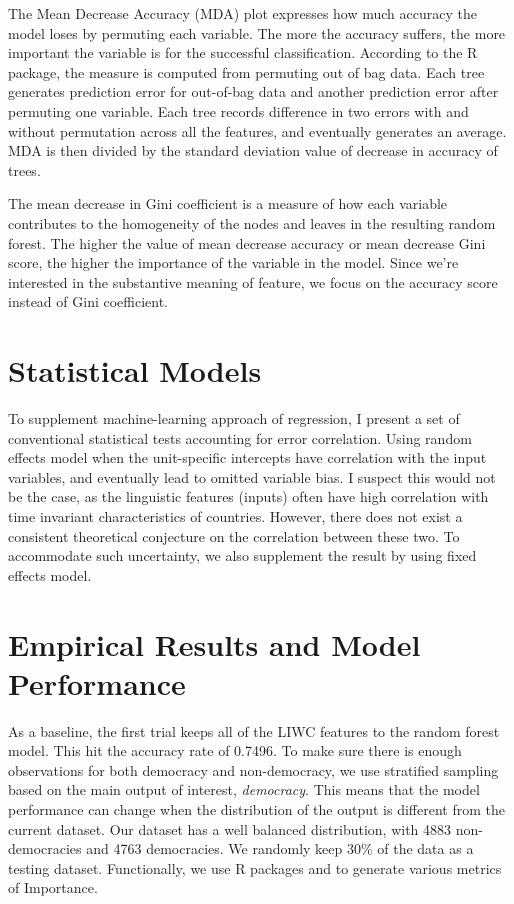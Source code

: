 \documentclass[12pt]{article}
\begin{document}
The Mean Decrease Accuracy (MDA) plot expresses how much accuracy the model loses by permuting each variable. The more the accuracy suffers, the more important the variable is for the successful classification. According to the \textcite{liaw_classification_2002} R package, the measure is computed from permuting out of bag data. Each tree generates prediction error for out-of-bag data and another prediction error after permuting one variable. Each tree records difference in two errors with and without permutation across all the features, and eventually generates an average. MDA is then divided by the standard deviation value of decrease in accuracy of trees. 

The mean decrease in Gini coefficient is a measure of how each variable contributes to the homogeneity of the nodes and leaves in the resulting random forest. The higher the value of mean decrease accuracy or mean decrease Gini score, the higher the importance of the variable in the model. Since we're interested in the substantive meaning of feature, we focus on the accuracy score instead of Gini coefficient.


\section{Statistical Models}
To supplement machine-learning approach of regression, I present a set of conventional statistical tests accounting for error correlation.  Using random effects model when the unit-specific intercepts have correlation with the input variables, and eventually lead to omitted variable bias. I suspect this would not be the case, as the linguistic features (inputs) often have high correlation with time invariant characteristics of countries. However, there does not exist a consistent theoretical conjecture on the correlation between these two. To accommodate such uncertainty, we also supplement the result by using fixed effects model.

\section{Empirical Results and Model Performance}
As a baseline, the first trial keeps all of the LIWC features to the random forest model. This hit the accuracy rate of 0.7496. To make sure there is enough observations for both democracy and non-democracy, we use stratified sampling based on the main output of interest, \textit{democracy}. This means that the model performance can change when the distribution of the output is different from the current dataset. Our dataset has a well balanced distribution, with 4883 non-democracies and 4763 democracies. We randomly keep 30\% of the data as a testing dataset. Functionally, we use R packages \textcite{paluszynska_randomforestexplainer_2020} and \textcite{liaw_classification_2002} to generate various metrics of Importance. 
\end{document}
